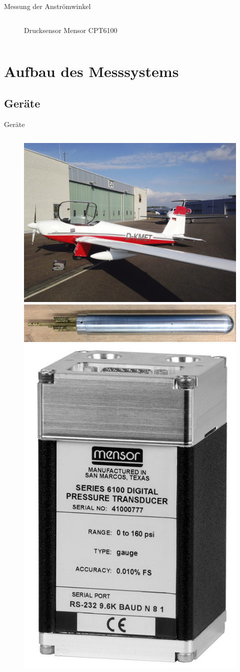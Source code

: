 \documentclass[ucs,9pt]{beamer}
\begin{document}
\begin{frame}{Messung der Anströmwinkel}
\begin{columns}
\begin{column}[t]{0.35\textwidth}
{\begin{figure}
				\caption{Drucksensor Mensor CPT6100}
			\end{figure}}
		\end{column}
	\end{columns}
\end{frame}

\section{Aufbau des Messsystems}

\subsection{Geräte}

\begin{frame}{Geräte}
	\begin{columns}
		\begin{column}[t]{0.45\textwidth}
			\begin{figure}
				\includegraphics[width=\textwidth]{./docmedia/ask16.jpg}
				\qquad
				\includegraphics[width=\textwidth]{./docmedia/sonde.jpg}
				\qquad
				\includegraphics[width=.2\textwidth]{./docmedia/cpt6100.jpg}

\end{figure}
\end{column}
\end{columns}
\end{frame}
\end{document}
